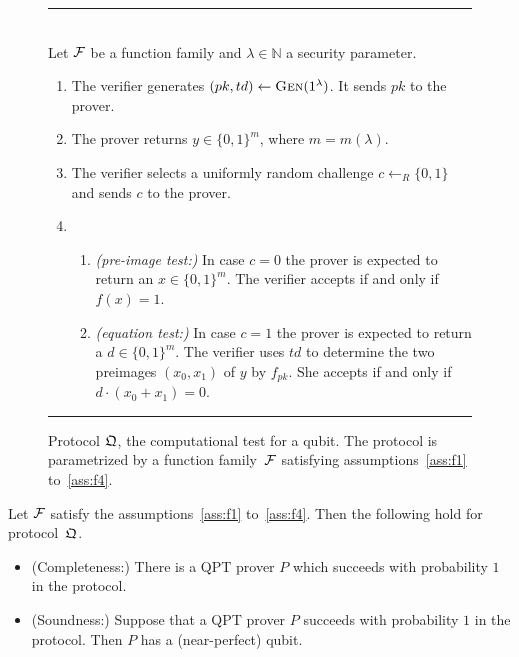 \begin{figure}[htbp]
\rule[1ex]{16.5cm}{0.5pt}\\
Let $\mathcal{F}$ be a function family and $\lambda\in\mathbb{N}$ a security parameter. \begin{enumerate}
\item The verifier generates $(pk,td)\leftarrow \textsc{Gen}(1^\lambda)$. It sends $pk$ to the prover. 
\item The prover returns $y \in \{0,1\}^m$, where $m=m(\lambda)$. 
\item The verifier selects a uniformly random challenge $c\leftarrow_R \{0,1\}$ and sends $c$ to the prover. 
\item 
\begin{enumerate}
\item \emph{(pre-image test:)} In case $c=0$ the prover is expected to return an $x\in\{0,1\}^m$. The verifier accepts if and only if $f(x)=1$. 
\item \emph{(equation test:)} In case $c=1$ the prover is expected to return a $d\in \{0,1\}^m$. The verifier uses $td$ to determine the two preimages $(x_0,x_1)$ of $y$ by $f_{pk}$. She accepts if and only if $d\cdot(x_0+ x_1)=0$. 
\end{enumerate}
\end{enumerate}
\rule[1ex]{16.5cm}{0.5pt}
\caption{Protocol $\mathfrak{Q}$, the computational test for a qubit. The protocol is parametrized by a function family~$\mathcal{F}$ satisfying assumptions~\ref{ass:f1} to~\ref{ass:f4}.}
\label{fig:protocol-comp-test}
\end{figure}



\begin{theorem}\label{thm:comp-qubit}
Let $\mathcal{F}$ satisfy the assumptions~\ref{ass:f1} to~\ref{ass:f4}. Then the following hold for protocol~$\mathfrak{Q}$.
\begin{itemize}
\item (Completeness:) There is a QPT prover $P$ which succeeds with probability $1$ in the protocol.
\item (Soundness:) Suppose that a QPT prover $P$ succeeds with probability $1$ in the protocol. Then $P$ has a (near-perfect) qubit. 
\end{itemize}
\end{theorem}

